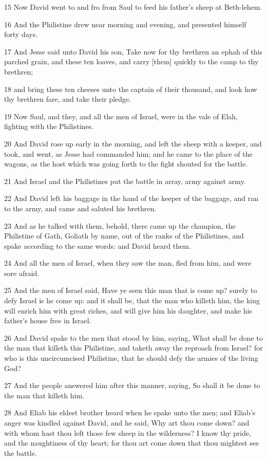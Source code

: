 \par 15 Now David went to and fro from Saul to feed his father's sheep at Beth-lehem.
\par 16 And the Philistine drew near morning and evening, and presented himself forty days.
\par 17 And Jesse said unto David his son, Take now for thy brethren an ephah of this parched grain, and these ten loaves, and carry [them] quickly to the camp to thy brethren;
\par 18 and bring these ten cheeses unto the captain of their thousand, and look how thy brethren fare, and take their pledge.
\par 19 Now Saul, and they, and all the men of Israel, were in the vale of Elah, fighting with the Philistines.
\par 20 And David rose up early in the morning, and left the sheep with a keeper, and took, and went, as Jesse had commanded him; and he came to the place of the wagons, as the host which was going forth to the fight shouted for the battle.
\par 21 And Israel and the Philistines put the battle in array, army against army.
\par 22 And David left his baggage in the hand of the keeper of the baggage, and ran to the army, and came and saluted his brethren.
\par 23 And as he talked with them, behold, there came up the champion, the Philistine of Gath, Goliath by name, out of the ranks of the Philistines, and spake according to the same words: and David heard them.
\par 24 And all the men of Israel, when they saw the man, fled from him, and were sore afraid.
\par 25 And the men of Israel said, Have ye seen this man that is come up? surely to defy Israel is he come up: and it shall be, that the man who killeth him, the king will enrich him with great riches, and will give him his daughter, and make his father's house free in Israel.
\par 26 And David spake to the men that stood by him, saying, What shall be done to the man that killeth this Philistine, and taketh away the reproach from Israel? for who is this uncircumcised Philistine, that he should defy the armies of the living God?
\par 27 And the people answered him after this manner, saying, So shall it be done to the man that killeth him.
\par 28 And Eliab his eldest brother heard when he spake unto the men; and Eliab's anger was kindled against David, and he said, Why art thou come down? and with whom hast thou left those few sheep in the wilderness? I know thy pride, and the naughtiness of thy heart; for thou art come down that thou mightest see the battle.
